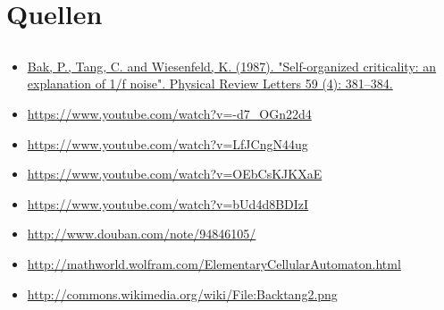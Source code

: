 \documentclass{beamer}
\begin{document}
\section{Quellen}
\subsection{}
\begin{frame}{\insertsection}{\insertsubsection}
	\begin{itemize}
        \tiny
        \item \url{Bak, P., Tang, C. and Wiesenfeld, K. (1987). "Self-organized criticality: an
            explanation of 1/f noise". Physical Review Letters 59 (4): 381–384.}
        \item \url{https://www.youtube.com/watch?v=-d7\_OGn22d4}
        \item \url{https://www.youtube.com/watch?v=LfJCngN44ug}
        \item \url{https://www.youtube.com/watch?v=OEbCsKJKXaE}
        \item \url{https://www.youtube.com/watch?v=bUd4d8BDIzI}
        \item \url{http://www.douban.com/note/94846105/}
        \item \url{http://mathworld.wolfram.com/ElementaryCellularAutomaton.html}
        \item \url{http://commons.wikimedia.org/wiki/File:Backtang2.png}
	\end{itemize}
\end{frame}
\end{document}
